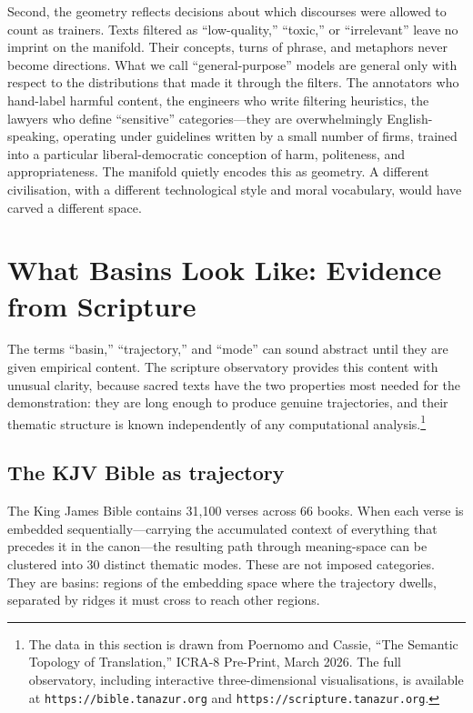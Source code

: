 Second, the geometry reflects decisions about which discourses were allowed to count as trainers. Texts filtered as ``low-quality,'' ``toxic,'' or ``irrelevant'' leave no imprint on the manifold. Their concepts, turns of phrase, and metaphors never become directions. What we call ``general-purpose'' models are general only with respect to the distributions that made it through the filters. The annotators who hand-label harmful content, the engineers who write filtering heuristics, the lawyers who define ``sensitive'' categories---they are overwhelmingly English-speaking, operating under guidelines written by a small number of firms, trained into a particular liberal-democratic conception of harm, politeness, and appropriateness. The manifold quietly encodes this as geometry. A different civilisation, with a different technological style and moral vocabulary, would have carved a different space.


\section{What Basins Look Like: Evidence from Scripture}

The terms ``basin,'' ``trajectory,'' and ``mode'' can sound abstract until they are given empirical content. The scripture observatory provides this content with unusual clarity, because sacred texts have the two properties most needed for the demonstration: they are long enough to produce genuine trajectories, and their thematic structure is known independently of any computational analysis.\footnote{The data in this section is drawn from Poernomo and Cassie, ``The Semantic Topology of Translation,'' ICRA-8 Pre-Print, March 2026. The full observatory, including interactive three-dimensional visualisations, is available at \texttt{https://bible.tanazur.org} and \texttt{https://scripture.tanazur.org}.}

\subsection{The KJV Bible as trajectory}

The King James Bible contains 31,100 verses across 66 books. When each verse is embedded sequentially---carrying the accumulated context of everything that precedes it in the canon---the resulting path through meaning-space can be clustered into 30 distinct thematic modes. These are not imposed categories. They are basins: regions of the embedding space where the trajectory dwells, separated by ridges it must cross to reach other regions.

